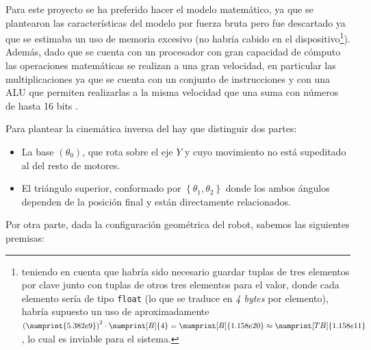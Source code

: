 Para este proyecto se ha preferido hacer el modelo matemático, ya que se plantearon las
características del modelo por fuerza bruta pero fue descartado ya que se estimaba un
uso de memoria excesivo (no habría cabido en el dispositivo\footnote{teniendo en cuenta
que habría sido necesario guardar tuplas de tres elementos por clave junto con tuplas de
otros tres elementos para el valor, donde cada elemento sería de tipo \texttt{float}
(lo que se traduce en \textit{4 bytes} por elemento), habría supuesto un uso de 
aproximadamente $\left(\numprint{5.382e9}\right)^2 \cdot \numprint[B]{4} = \numprint[B]{1.158e20} \approx \numprint[TB]{1.158e11} $,
lo cual es inviable para el sistema.}). Además, dado que se cuenta con un procesador
con gran capacidad de cómputo las operaciones matemáticas se realizan a una gran velocidad,
en particular las multiplicaciones ya que se cuenta con un conjunto de instrucciones y
con una \ac{ALU} que permiten realizarlas a la misma velocidad que una suma con números de hasta
16 bits \cite{microchipDsPIC33EPIC24EFRM2010}.

Para plantear la cinemática inversa del \pArm{} hay que distinguir dos partes:
\begin{itemize}
    \item La base $\left(\theta_0\right)$, que rota sobre el eje $Y$ y cuyo movimiento no está supeditado al
    del resto de motores.

    \item El triángulo superior, conformado por $\left\{\theta_1, \theta_2\right\}$ donde
    los ambos ángulos dependen de la posición final y están directamente relacionados.
\end{itemize}

Por otra parte, dada la configuración geométrica del robot, sabemos las siguientes premisas:

